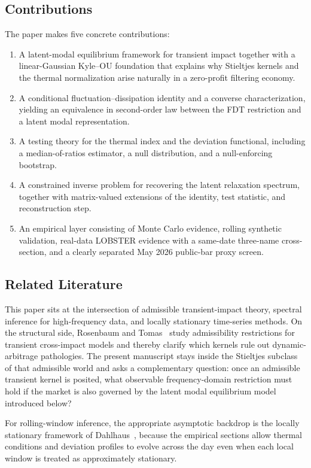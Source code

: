 \documentclass[11pt]{article}
\newcommand{\REV}{}
\begin{document}
\subsection{Contributions}
\REV
The paper makes five concrete contributions:
\begin{enumerate}[label=\arabic*.]
  \item A latent-modal equilibrium framework for transient impact together with a linear-Gaussian Kyle--OU foundation that explains why Stieltjes kernels and the thermal normalization arise naturally in a zero-profit filtering economy.
  \item A conditional fluctuation--dissipation identity and a converse characterization, yielding an equivalence in second-order law between the FDT restriction and a latent modal representation.
  \item A testing theory for the thermal index and the deviation functional, including a median-of-ratios estimator, a null distribution, and a null-enforcing bootstrap.
  \item A constrained inverse problem for recovering the latent relaxation spectrum, together with matrix-valued extensions of the identity, test statistic, and reconstruction step.
  \item An empirical layer consisting of Monte Carlo evidence, rolling synthetic validation, real-data LOBSTER evidence with a same-date three-name cross-section, and a clearly separated May 2026 public-bar proxy screen.
\end{enumerate}

\subsection{Related Literature}
\REV
This paper sits at the intersection of admissible transient-impact theory, spectral inference for high-frequency data, and locally stationary time-series methods. On the structural side, Rosenbaum and Tomas~\cite{RosenbaumTomas2022} study admissibility restrictions for transient cross-impact models and thereby clarify which kernels rule out dynamic-arbitrage pathologies. The present manuscript stays inside the Stieltjes subclass of that admissible world and asks a complementary question: once an admissible transient kernel is posited, what observable frequency-domain restriction must hold if the market is also governed by the latent modal equilibrium model introduced below?

\REV
For rolling-window inference, the appropriate asymptotic backdrop is the locally stationary framework of Dahlhaus~\cite{Dahlhaus1997,Dahlhaus1996}, because the empirical sections allow thermal conditions and deviation profiles to evolve across the day even when each local window is treated as approximately stationary.
\end{document}
